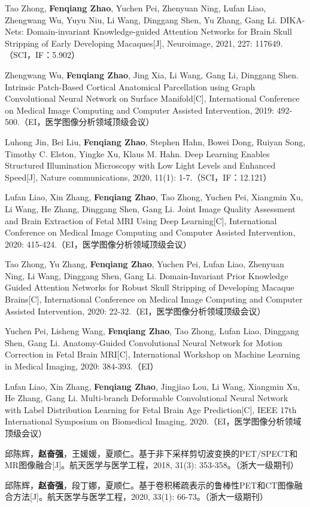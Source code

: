 {        \noindent [9] Tao Zhong, \textbf{Fenqiang Zhao}, Yuchen Pei, Zhenyuan Ning, Lufan Liao, Zhengwang Wu, Yuyu Niu, Li Wang, Dinggang Shen, Yu Zhang, Gang Li. DIKA-Nets: Domain-invariant Knowledge-guided Attention Networks for Brain Skull Stripping of Early Developing Macaques[J], Neuroimage, 2021, 227: 117649.（SCI，IF：5.902） 
        
        \noindent [10] Zhengwang Wu, \textbf{Fenqiang Zhao}, Jing Xia, Li Wang, Gang Li, Dinggang Shen. Intrinsic Patch-Based Cortical Anatomical Parcellation using Graph Convolutional Neural Network on Surface Manifold[C], International Conference on Medical Image Computing and Computer Assisted Intervention, 2019: 492-500.（EI，医学图像分析领域顶级会议）
        
        \noindent [11] Luhong Jin, Bei Liu, \textbf{Fenqiang Zhao}, Stephen Hahn, Bowei Dong, Ruiyan Song, Timothy C. Elston, Yingke Xu, Klaus M. Hahn. Deep Learning Enables Structured Illumination Microscopy with Low Light Levels and Enhanced Speed[J], Nature communications, 2020, 11(1): 1-7.（SCI，IF：12.121）
        
        \noindent [12] Lufan Liao, Xin Zhang, \textbf{Fenqiang Zhao}, Tao Zhong, Yuchen Pei, Xiangmin Xu, Li Wang, He Zhang, Dinggang Shen, Gang Li. Joint Image Quality Assessment and Brain Extraction of Fetal MRI Using Deep Learning[C], International Conference on Medical Image Computing and Computer Assisted Intervention, 2020: 415-424.（EI，医学图像分析领域顶级会议）
        
        \noindent [13] Tao Zhong, Yu Zhang, \textbf{Fenqiang Zhao}, Yuchen Pei, Lufan Liao, Zhenyuan Ning, Li Wang, Dinggang Shen, Gang Li. Domain-Invariant Prior Knowledge Guided Attention Networks for Robust Skull Stripping of Developing Macaque Brains[C],  International Conference on Medical Image Computing and Computer Assisted Intervention, 2020: 22-32.（EI，医学图像分析领域顶级会议）
        
        \noindent [14] Yuchen Pei, Lisheng Wang, \textbf{Fenqiang Zhao}, Tao Zhong, Lufan Liao, Dinggang Shen, Gang Li. Anatomy-Guided Convolutional Neural Network for Motion Correction in Fetal Brain MRI[C], International Workshop on Machine Learning in Medical Imaging, 2020: 384-393.（EI）
        
        \noindent [15] Lufan Liao, Xin Zhang, \textbf{Fenqiang Zhao}, Jingjiao Lou, Li Wang, Xiangmin Xu, He Zhang, Gang Li. Multi-branch Deformable Convolutional Neural Network with Label Distribution Learning for Fetal Brain Age Prediction[C], IEEE 17th International Symposium on Biomedical Imaging, 2020.（EI，医学图像分析领域顶级会议）
        
        \noindent [16] 邱陈辉，\textbf{赵奋强}，王媛媛，夏顺仁。基于非下采样剪切波变换的PET/SPECT和MR图像融合[J]。航天医学与医学工程，2018, 31(3): 353-358。（浙大一级期刊）

        \noindent [17] 邱陈辉，\textbf{赵奋强}，段丁娜，夏顺仁。基于卷积稀疏表示的鲁棒性PET和CT图像融合方法[J]。航天医学与医学工程，2020, 33(1): 66-73。（浙大一级期刊）
        }